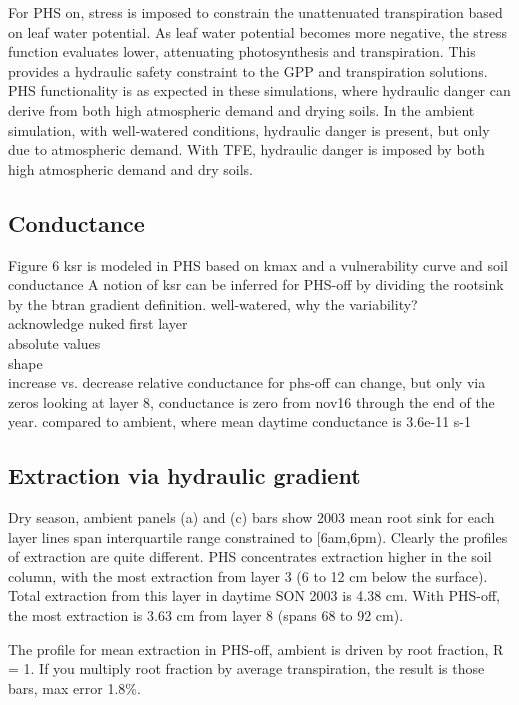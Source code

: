 \documentclass[draft,linenumbers]{agujournal}
\begin{document}
For PHS on, stress is imposed to constrain the unattenuated transpiration based on leaf water potential. 
As leaf water potential becomes more negative, the stress function evaluates lower, attenuating photosynthesis and transpiration.
This provides a hydraulic safety constraint to the GPP and transpiration solutions.
PHS functionality is as expected in these simulations, where hydraulic danger can derive from both high atmospheric demand and drying soils.
In the ambient simulation, with well-watered conditions, hydraulic danger is present, but only due to atmospheric demand. 
With TFE, hydraulic danger is imposed by both high atmospheric demand and dry soils.

\subsection{Conductance}
Figure 6
ksr is modeled in PHS based on kmax and a vulnerability curve and soil conductance
A notion of ksr can be inferred for PHS-off by dividing the rootsink by the btran gradient definition.
well-watered, why the variability?\\
acknowledge nuked first layer \\
absolute values \\
shape \\
increase vs. decrease
relative conductance for phs-off can change, but only via zeros
looking at layer 8, conductance is zero from nov16 through the end of the year.
compared to ambient, where mean daytime conductance is 3.6e-11 s-1

\subsection{Extraction via hydraulic gradient}

Dry season, ambient panels (a) and (c)
bars show 2003 mean root sink for each layer
lines span interquartile range
constrained to [6am,6pm).
Clearly the profiles of extraction are quite different.
PHS concentrates extraction higher in the soil column, with the most extraction from layer 3 (6 to 12 cm below the surface).
Total extraction from this layer in daytime SON 2003 is 4.38 cm.
With PHS-off, the most extraction is 3.63 cm from layer 8 (spans 68 to 92 cm).

The profile for mean extraction in PHS-off, ambient is driven by root fraction, R = 1.
If you multiply root fraction by average transpiration, the result is those bars, max error 1.8\%.
\end{document}
